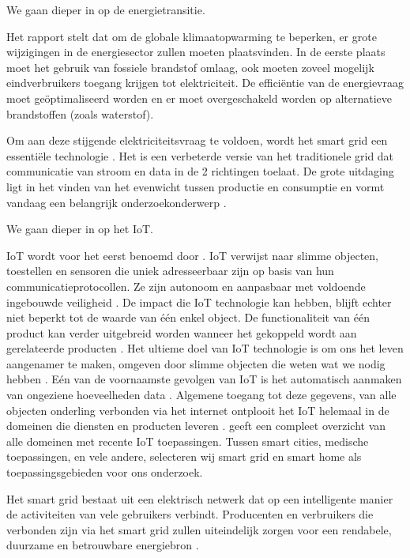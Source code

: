 \documentclass{hogent-article}
\begin{document}
    We gaan dieper in op de energietransitie.
    
    Het \textcite{IPCC2022} rapport stelt dat om de globale klimaatopwarming te beperken, er grote wijzigingen in de energiesector zullen moeten plaatsvinden. In de eerste plaats moet het gebruik van fossiele brandstof omlaag, ook moeten zoveel mogelijk eindverbruikers toegang krijgen tot elektriciteit. De efficiëntie van de energievraag moet geöptimaliseerd worden en er moet overgeschakeld worden op alternatieve brandstoffen (zoals waterstof).
    
    Om aan deze stijgende elektriciteitsvraag te voldoen, wordt het smart grid een essentiële technologie \autocite{Patel2022}. Het is een verbeterde versie van het traditionele grid dat communicatie van stroom en data in de 2 richtingen toelaat. De grote uitdaging ligt in het vinden van het evenwicht tussen productie en consumptie en vormt vandaag een belangrijk onderzoekonderwerp \autocite{KouveliotisLysikatos2022}.
    
    We gaan dieper in op het IoT.
    
    IoT wordt voor het eerst benoemd door \textcite{Ashton2009}. IoT verwijst naar slimme objecten, toestellen en sensoren die uniek adresseerbaar zijn op basis van hun communicatieprotocollen. Ze zijn autonoom en aanpasbaar met voldoende ingebouwde veiligheid \autocite{Shafique2020}. De impact die IoT technologie kan hebben, blijft echter niet beperkt tot de waarde van één enkel object. De functionaliteit van één product kan verder uitgebreid worden wanneer het gekoppeld wordt aan gerelateerde producten \autocite{Wortmann2015}. Het ultieme doel van IoT technologie is om ons het leven aangenamer te maken, omgeven door slimme objecten die weten wat we nodig hebben \autocite{Kassab2020}. Eén van de voornaamste gevolgen van IoT is het automatisch aanmaken van ongeziene hoeveelheden data \autocite{Gubbi2013} \autocite{Kassab2020}. Algemene toegang tot deze gegevens, van alle objecten onderling verbonden via het internet ontplooit het IoT helemaal in de domeinen die diensten en producten leveren \autocite{Gubbi2013}. \textcite{Kassab2020} geeft een compleet overzicht van alle domeinen met recente IoT toepassingen. Tussen smart cities, medische toepassingen, en vele andere, selecteren wij smart grid en smart home als toepassingsgebieden voor ons onderzoek.
    
    Het smart grid bestaat uit een elektrisch netwerk dat op een intelligente manier de activiteiten van vele gebruikers verbindt. Producenten en verbruikers die verbonden zijn via het smart grid zullen uiteindelijk zorgen voor een rendabele, duurzame en betrouwbare energiebron \autocite{Kassab2020} .
    
\end{document}
